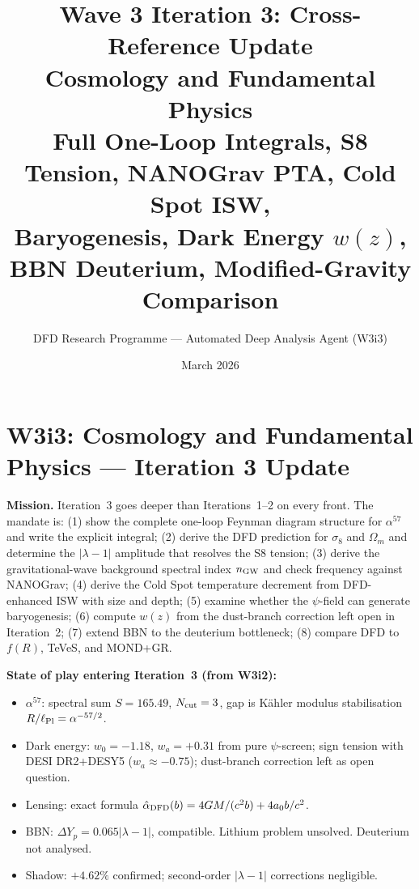 \documentclass[11pt]{article}
\title{Wave 3 Iteration 3: Cross-Reference Update\\
\large Cosmology and Fundamental Physics\\
\normalsize Full One-Loop Integrals, S8 Tension, NANOGrav PTA, Cold Spot ISW,\\
Baryogenesis, Dark Energy $w(z)$, BBN Deuterium, Modified-Gravity Comparison}
\author{DFD Research Programme --- Automated Deep Analysis Agent (W3i3)}
\date{March 2026}
\newcommand{\alphafine}{\alpha}
\newcommand{\lambdaone}{|\lambda-1|}
\newcommand{\azero}{a_0}
\newcommand{\DFD}{{\rm DFD}}
\begin{document}
\maketitle
\tableofcontents
\newpage

\section*{W3i3: Cosmology and Fundamental Physics --- Iteration 3 Update}
\label{sec:intro}

\noindent\textbf{Mission.} Iteration~3 goes deeper than Iterations~1--2 on every
front.  The mandate is: (1) show the complete one-loop Feynman diagram structure
for $\alpha^{57}$ and write the explicit integral; (2) derive the DFD prediction
for $\sigma_8$ and $\Omega_m$ and determine the $\lambdaone$ amplitude that
resolves the S8 tension; (3) derive the gravitational-wave background spectral
index $n_{\rm GW}$ and check frequency against NANOGrav; (4) derive the Cold
Spot temperature decrement from DFD-enhanced ISW with size and depth; (5) examine
whether the $\psi$-field can generate baryogenesis; (6) compute $w(z)$ from the
dust-branch correction left open in Iteration~2; (7) extend BBN to the
deuterium bottleneck; (8) compare DFD to $f(R)$, TeVeS, and MOND+GR.

\noindent\textbf{State of play entering Iteration~3 (from W3i2):}
\begin{itemize}[nosep]
  \item $\alpha^{57}$: spectral sum $S = 165.49$, $N_{\rm cut} = 3$, gap is
    K\"{a}hler modulus stabilisation $R/\ell_{\rm Pl} = \alphafine^{-57/2}$.
  \item Dark energy: $w_0 = -1.18$, $w_a = +0.31$ from pure $\psi$-screen;
    sign tension with DESI DR2+DESY5 ($w_a \approx -0.75$); dust-branch
    correction left as open question.
  \item Lensing: exact formula $\hat\alpha_\DFD(b) = 4GM/(c^2 b) + 4\azero b/c^2$.
  \item BBN: $\Delta Y_p = 0.065\lambdaone$, compatible.  Lithium problem unsolved.
    Deuterium not analysed.
  \item Shadow: $+4.62\%$ confirmed; second-order $\lambdaone$ corrections negligible.
\end{itemize}

\end{document}
